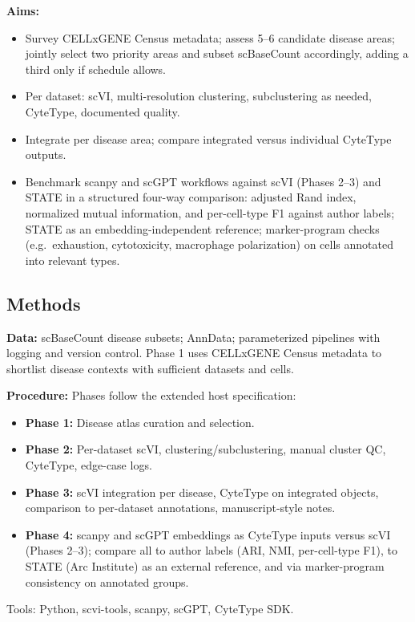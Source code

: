 \documentclass[12pt,a4paper]{article}
\begin{document}
\textbf{Aims:}
\begin{itemize}
    \item[\textbf{(A)}] Survey CELLxGENE Census metadata; assess 5–6 candidate disease areas; jointly select two priority areas and subset scBaseCount accordingly, adding a third only if schedule allows.
    \item[\textbf{(B)}] Per dataset: scVI, multi-resolution clustering, subclustering as needed, CyteType, documented quality.
    \item[\textbf{(C)}] Integrate per disease area; compare integrated versus individual CyteType outputs.
    \item[\textbf{(D)}] Benchmark scanpy and scGPT workflows against scVI (Phases 2--3) and STATE in a structured four-way comparison: adjusted Rand index, normalized mutual information, and per-cell-type F1 against author labels; STATE as an embedding-independent reference; marker-program checks (e.g.\ exhaustion, cytotoxicity, macrophage polarization) on cells annotated into relevant types.
\end{itemize}

\subsection*{Methods}

\textbf{Data:} scBaseCount disease subsets; AnnData; parameterized pipelines with logging and version control. Phase 1 uses CELLxGENE Census metadata to shortlist disease contexts with sufficient datasets and cells.

\textbf{Procedure:} Phases follow the extended host specification:
\begin{itemize}
    \item \textbf{Phase 1:} Disease atlas curation and selection.
    \item \textbf{Phase 2:} Per-dataset scVI, clustering/subclustering, manual cluster QC, CyteType, edge-case logs.
    \item \textbf{Phase 3:} scVI integration per disease, CyteType on integrated objects, comparison to per-dataset annotations, manuscript-style notes.
    \item \textbf{Phase 4:} scanpy and scGPT embeddings as CyteType inputs versus scVI (Phases 2--3); compare all to author labels (ARI, NMI, per-cell-type F1), to STATE (Arc Institute) as an external reference, and via marker-program consistency on annotated groups.
\end{itemize}
Tools: Python, scvi-tools, scanpy, scGPT, CyteType SDK.
\end{document}
